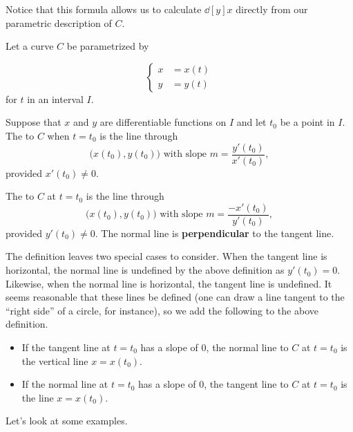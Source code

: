 \documentclass{ximera}
\begin{document}
Notice that this formula allows us to calculate $\dd[y]{x}$ directly from our parametric description of $C$.

\begin{definition}
Let a curve $C$ be parametrized by 

\[ 
\begin{cases}
x&=x(t) \\
y&=y(t)
\end{cases}
\]
for $t$ in an interval $I$. 

Suppose that $x$ and $y$ are differentiable functions on $I$ and let $t_{0}$ be a point in $I$. The  to $C$ when $t=t_0$ is the line through
\[
\big(x(t_0),y(t_0)\big)\text{ with slope }m=\frac{y'(t_0)}{x'(t_0)},
\]
provided $x'(t_0)\neq 0$.

The  to $C$ at $t=t_0$ is the line through 
\[
\big(x(t_0),y(t_0)\big)\text{ with slope }m=\frac{-x'(t_0)}{y'(t_0)},
\]
provided $y'(t_0)\neq 0$.  The normal line is \textbf{perpendicular}
to the tangent line.
\end{definition}

The definition leaves two special cases to consider. When the tangent
line is horizontal, the normal line is undefined by the above
definition as $y'(t_0)=0$. Likewise, when the normal line is
horizontal, the tangent line is undefined. It seems reasonable that
these lines be defined (one can draw a line tangent to the ``right
side'' of a circle, for instance), so we add the following to the
above definition.

\begin{itemize}
\item If the tangent line at $t=t_0$ has a slope of $0$, the normal
  line to $C$ at $t=t_0$ is the vertical line $x=x(t_0)$.
\item If the normal line at $t=t_0$ has a slope of $0$, the tangent
  line to $C$ at $t=t_0$ is the line $x=x(t_0)$.
\end{itemize}

Let's look at some examples. 
\end{document}
